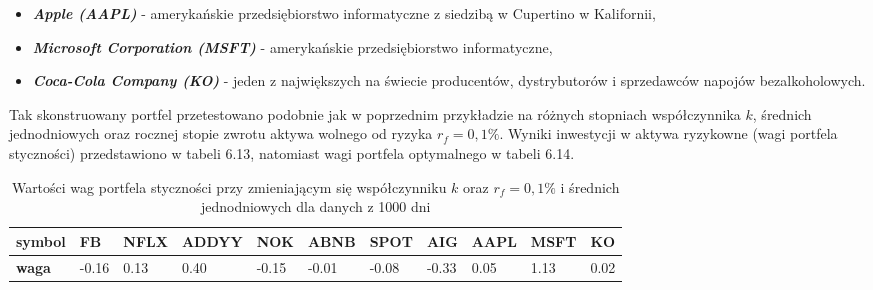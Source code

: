 \documentclass[magister]{dyplom}
\begin{document}
\begin{itemize}
	\item \textit{\textbf{Apple (AAPL)}} - amerykańskie przedsiębiorstwo informatyczne z siedzibą w Cupertino w Kalifornii,\cite{apple}
	\item \textit{\textbf{Microsoft Corporation (MSFT)}} - amerykańskie przedsiębiorstwo informatyczne,\cite{microsoft}
	\item \textit{\textbf{Coca-Cola Company (KO)}} -  jeden z największych na świecie producentów, dystrybutorów i sprzedawców napojów bezalkoholowych.\cite{coke}
\end{itemize}

Tak skonstruowany portfel przetestowano podobnie jak w poprzednim przykładzie na różnych stopniach współczynnika $k$, średnich jednodniowych oraz rocznej stopie zwrotu aktywa wolnego od ryzyka $r_f = 0,1\%$.
Wyniki inwestycji w aktywa ryzykowne (wagi portfela styczności) przedstawiono w tabeli 6.13, natomiast wagi portfela optymalnego w tabeli 6.14.

\begin{table}[ht]
	\centering
	\caption{Wartości wag portfela styczności przy zmieniającym się współczynniku $k$ oraz $r_f = 0,1\%$ i średnich jednodniowych dla danych z 1000 dni}
	\begin{tabular}{|l|l|l|l|l|l|l|l|l|l|l|}
		\hline
		\textbf{symbol} & \textbf{FB} & \textbf{NFLX} & \textbf{ADDYY} & \textbf{NOK} & \textbf{ABNB} & \textbf{SPOT} & \textbf{AIG} & \textbf{AAPL} & \textbf{MSFT} & \textbf{KO} \\ \hline
		\textbf{waga}   & -0.16       & 0.13          & 0.40           & -0.15        & -0.01         & -0.08         & -0.33        & 0.05          & 1.13          & 0.02        \\ \hline
	\end{tabular}
\end{table}
\end{document}
